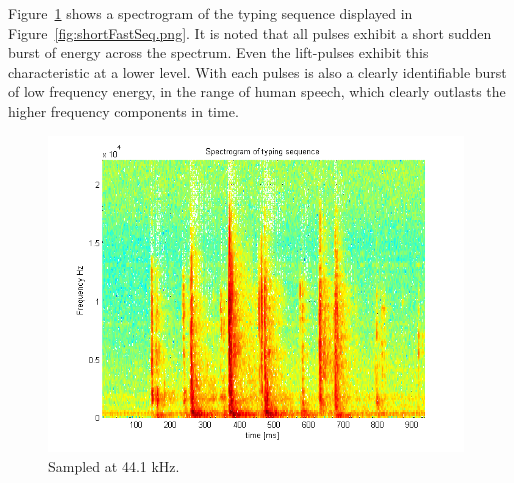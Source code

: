 Figure~\ref{fig:shortFastSeqSpec.png} shows a spectrogram of the typing sequence displayed in Figure~\ref{fig:shortFastSeq.png}. It is noted that all pulses exhibit a short sudden burst of energy across the spectrum. Even the lift-pulses exhibit this characteristic at a lower level. With each pulses is also a clearly identifiable burst of low frequency energy, in the range of human speech, which clearly outlasts the higher frequency components in time. 

\begin{figure}
  \begin{center}
    \includegraphics[width=110mm]{shortFastSeqSpec.png}
    \caption{Sampled at 44.1 kHz.}\label{fig:shortFastSeqSpec.png}
  \end{center}
\end{figure}


